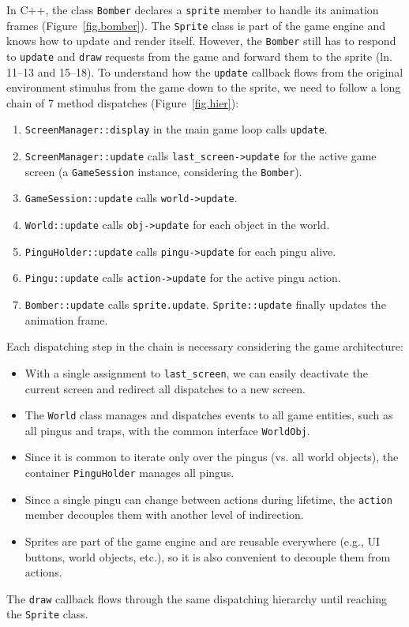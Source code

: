 \documentclass{vgtc}                          %
\newcommand{\code}[1] {{\small{\texttt{#1}}}}
\begin{document}
In C++, the class \code{Bomber} declares a \code{sprite} member to handle its
animation frames (Figure~\ref{fig.bomber}).
%
The \code{Sprite} class is part of the game engine and knows how to update and
render itself.
However, the \code{Bomber} still has to respond to \code{update} and
\code{draw} requests from the game and forward them to the sprite
(ln. 11--13 and 15--18).
%
To understand how the \code{update} callback flows from the original
environment stimulus from the game down to the sprite, we need to follow a long
chain of 7 method dispatches (Figure~\ref{fig.hier}):
%
\begin{enumerate}
\item \code{ScreenManager::display} in the main game loop calls \code{update}.
\item \code{ScreenManager::update} calls \code{last\_screen->update} for the
      active game screen (a \code{GameSession} instance, considering the
      \code{Bomber}).
\item \code{GameSession::update} calls \code{world->update}.
\item \code{World::update} calls \code{obj->update} for each object in the
      world.
\item \code{PinguHolder::update} calls \code{pingu->update} for each pingu
      alive.
\item \code{Pingu::update} calls \code{action->update} for the active pingu
      action.
\item \code{Bomber::update} calls \code{sprite.update}.
      \code{Sprite::update} finally updates the animation frame.
\end{enumerate}
%
Each dispatching step in the chain is necessary considering the game
architecture:
%
\begin{itemize}
\item With a single assignment to \code{last\_screen}, we can easily deactivate
      the current screen and redirect all dispatches to a new screen.
\item The \code{World} class manages and dispatches events to all game
      entities, such as all pingus and traps, with the common interface
      \code{WorldObj}.
\item Since it is common to iterate only over the pingus (vs. all world
      objects), the container \code{PinguHolder} manages all pingus.
\item Since a single pingu can change between actions during lifetime, the
      \code{action} member decouples them with another level of indirection.
\item Sprites are part of the game engine and are reusable everywhere (e.g., UI
      buttons, world objects, etc.), so it is also convenient to decouple them
      from actions.
\end{itemize}
%
The \code{draw} callback flows through the same dispatching hierarchy until
reaching the \code{Sprite} class.
\end{document}
